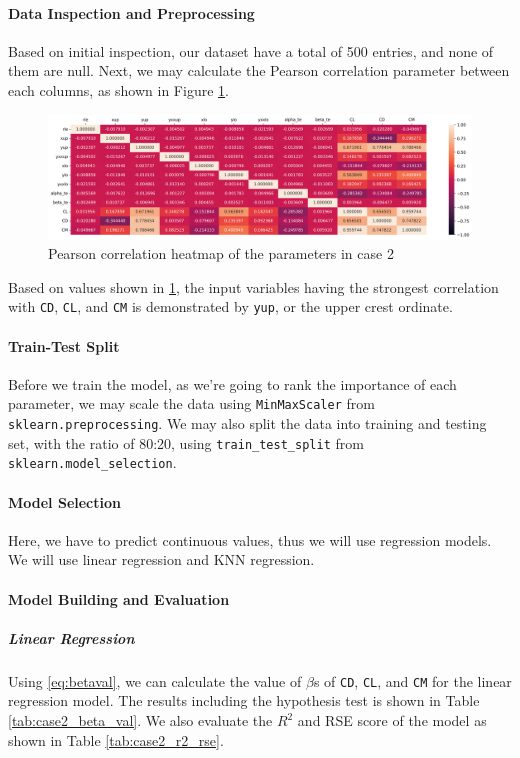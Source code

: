 \documentclass[conf]{new-aiaa}
\begin{document}
\paragraph{Data Inspection and Preprocessing}
Based on initial inspection, our dataset have a total of 500 entries, and none of them are null. Next, we may calculate the Pearson correlation parameter between each columns, as shown in Figure \ref{fig:case2_corr_heatmap}.
\begin{figure}[H]
    \centering
    \includegraphics[width=1.0\textwidth]{graph/case2_corr_heatmap.png}
    \caption{\label{fig:case2_corr_heatmap} Pearson correlation heatmap of the parameters in case 2}
\end{figure}
Based on values shown in \ref{fig:case2_corr_heatmap}, the input variables having the strongest correlation with \texttt{CD}, \texttt{CL}, and \texttt{CM} is demonstrated by \texttt{yup}, or the upper crest ordinate.

\paragraph{Train-Test Split}  Before we train the model, as we're going to rank the importance of each parameter, we may scale the data using \texttt{MinMaxScaler} from \texttt{sklearn.preprocessing}. We may also split the data into training and testing set, with the ratio of 80:20, using \texttt{train\_test\_split} from \texttt{sklearn.model\_selection}.

\paragraph{Model Selection}
Here, we have to predict continuous values, thus we will use regression models. We will use linear regression and KNN regression. 

\paragraph{Model Building and Evaluation}
\subparagraph{Linear Regression}
Using \eqref{eq:betaval}, we can calculate the value of $\beta$s of \texttt{CD}, \texttt{CL}, and \texttt{CM} for the linear regression model. The results including the hypothesis test is shown in Table \ref{tab:case2_beta_val}. We also evaluate the $R^2$ and RSE score of the model as shown in Table \ref{tab:case2_r2_rse}.
\end{document}
